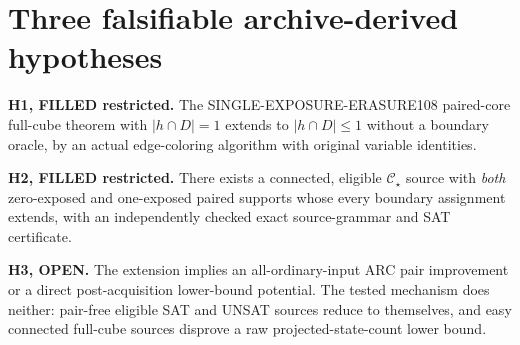 \documentclass[11pt]{article}
\newcommand{\CS}{\mathcal C_\star}
\begin{document}
\section{Three falsifiable archive-derived hypotheses}
\noindent\textbf{H1, FILLED restricted.} The SINGLE-EXPOSURE-ERASURE108 paired-core full-cube theorem with $|h\cap D|=1$ extends to $|h\cap D|\le1$ without a boundary oracle, by an actual edge-coloring algorithm with original variable identities.

\noindent\textbf{H2, FILLED restricted.} There exists a connected, eligible $\CS$ source with \emph{both} zero-exposed and one-exposed paired supports whose every boundary assignment extends, with an independently checked exact source-grammar and SAT certificate.

\noindent\textbf{H3, OPEN.} The extension implies an all-ordinary-input ARC pair improvement or a direct post-acquisition lower-bound potential. The tested mechanism does neither: pair-free eligible SAT and UNSAT sources reduce to themselves, and easy connected full-cube sources disprove a raw projected-state-count lower bound.
\end{document}
